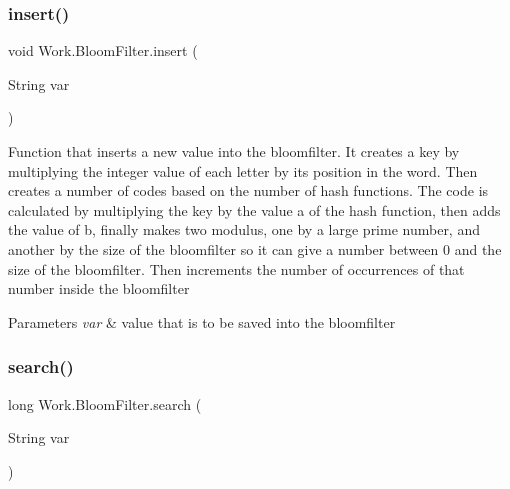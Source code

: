 \subsubsection{\texorpdfstring{insert()}{insert()}}
{\footnotesize\ttfamily void Work.\+Bloom\+Filter.\+insert (\begin{DoxyParamCaption}\item[{String}]{var }\end{DoxyParamCaption})\hspace{0.3cm}{\ttfamily [inline]}}

Function that inserts a new value into the bloomfilter. It creates a key by multiplying the integer value of each letter by its position in the word. Then creates a number of codes based on the number of hash functions. The code is calculated by multiplying the key by the value \textquotesingle{}a\textquotesingle{} of the hash function, then adds the value of \textquotesingle{}b\textquotesingle{}, finally makes two modulus, one by a large prime number, and another by the size of the bloomfilter so it can give a number between 0 and the size of the bloomfilter. Then increments the number of occurrences of that number inside the bloomfilter 
\begin{DoxyParams}{Parameters}
{\em var} & value that is to be saved into the bloomfilter \\
\hline
\end{DoxyParams}
\mbox{\label{classWork_1_1BloomFilter_a26d4c3ed24f8ecedb67d2ed34e81f5d4}} 
\subsubsection{\texorpdfstring{search()}{search()}}
{\footnotesize\ttfamily long Work.\+Bloom\+Filter.\+search (\begin{DoxyParamCaption}\item[{String}]{var }\end{DoxyParamCaption})\hspace{0.3cm}{\ttfamily [inline]}}

